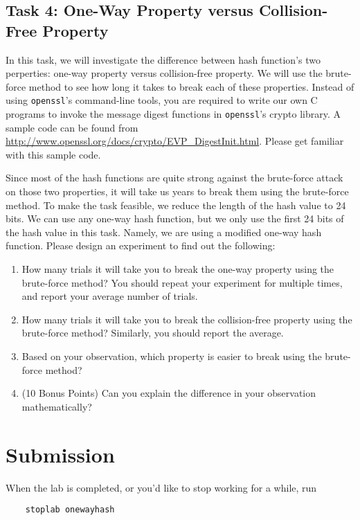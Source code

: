 \subsection{Task 4: One-Way Property versus Collision-Free Property}


In this task, we will investigate the difference between 
hash function's two perperties: one-way property versus collision-free property. 
We will use the brute-force method to see how long it takes to break
each of these properties. Instead of using {\tt openssl}'s command-line tools, 
you are required to write our own C programs to invoke the 
message digest functions in {\tt openssl}'s crypto library. 
A sample code can be found from 
\url{http://www.openssl.org/docs/crypto/EVP_DigestInit.html}. Please 
get familiar with this sample code.

Since most of the hash functions are quite strong against the brute-force
attack on those two properties, it will take us years to break them
using the brute-force method. To make the task feasible, we reduce 
the length of the hash value to 24 bits. We can use any one-way
hash function, but we only use the first 24 bits of the hash value
in this task. Namely, we are using a modified one-way hash function.
Please design an experiment to find out the following:

\begin{enumerate}
\item How many trials it will take you to break the one-way
property using the brute-force method? You should repeat your 
experiment for multiple times, and report your average number 
of trials.
\item How many trials it will take you to break the collision-free
property using the brute-force method? Similarly, you should 
report the average.
\item Based on your observation, which property is easier to 
break using the brute-force method?
\item (10 Bonus Points) Can you explain the difference in your 
observation mathematically?
\end{enumerate}

 

\section{Submission}
When the lab is completed, or you'd like to stop working for a while, run
\begin{verbatim}
    stoplab onewayhash
\end{verbatim}

